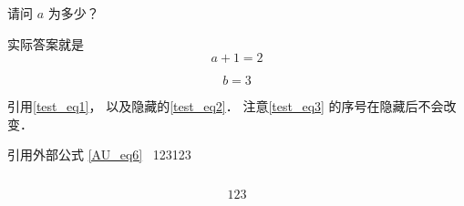 \begin{example}{}
请问 $a$ 为多少？
\pay

实际答案就是
\begin{equation}\label{test_eq2}
a + 1 = 2
\end{equation}
\paid
\end{example}

\begin{equation}\label{test_eq3}
b = 3
\end{equation}


引用\autoref{test_eq1}， 以及隐藏的\autoref{test_eq2}． 注意\autoref{test_eq3} 的序号在隐藏后不会改变．

引用外部公式 \autoref{AU_eq6}~ 123123

\begin{equation}

\end{equation}

\begin{equation}
123
\end{equation}
